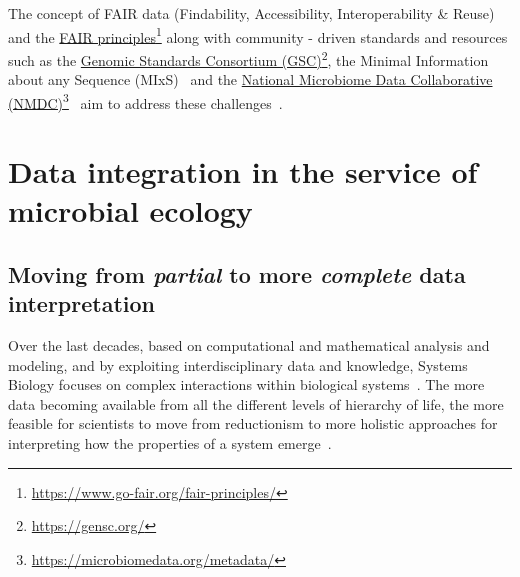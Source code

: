       The concept of FAIR data (Findability, Accessibility, Interoperability \& Reuse)
      and the \href{https://www.go-fair.org/fair-principles/}{FAIR principles}\footnote{\href{https://www.go-fair.org/fair-principles/}{https://www.go-fair.org/fair-principles/}}
      along with community - driven standards and resources such as 
      the \href{https://gensc.org/}{Genomic Standards Consortium (GSC)}\footnote{\href{https://gensc.org/}{https://gensc.org/}},
      the Minimal Information about any Sequence (MIxS)~\cite{yilmaz2011minimum, yilmaz2011genomic}
      and the \href{https://microbiomedata.org/metadata/}{National Microbiome Data Collaborative (NMDC)}\footnote{\href{https://microbiomedata.org/metadata/}{https://microbiomedata.org/metadata/}}~\cite{wood2020national}
      aim to address these challenges~\cite{wilkinson2016fair}.



\section{Data integration in the service of microbial ecology}


   \subsection{Moving from \textit{partial} to more \textit{complete} data interpretation}

      Over the last decades, based on
      computational and mathematical analysis and modeling,
      and by exploiting interdisciplinary data and knowledge, 
      Systems Biology focuses on complex interactions within biological systems~\cite{tavassoly2018systems}.
      The more data becoming available from all the different levels
      of hierarchy of life, the more feasible for scientists to 
      move from reductionism to more holistic approaches 
      for interpreting how the properties of a system emerge~\cite{noble2008music}.

